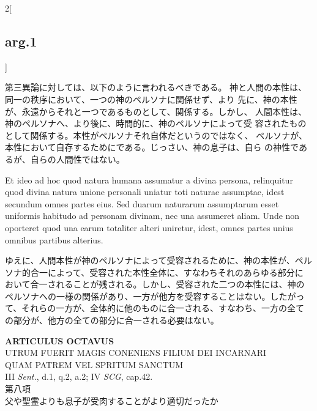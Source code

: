 \documentclass[paper=a4paper,fontsize=10pt,jafontsize=9pt,titlepage]{jlreq}
\begin{document}
\begin{paracol}{2}[\subsection{arg.1}]
\switchcolumn

第三異論に対しては、以下のように言われるべきである。
神と人間の本性は、同一の秩序において、一つの神のペルソナに関係せず、より
 先に、神の本性が、永遠からそれと一つであるものとして、関係する。しかし、
 人間本性は、神のペルソナへ、より後に、時間的に、神のペルソナによって受
 容されたものとして関係する。本性がペルソナそれ自体だというのではなく、
 ペルソナが、本性において自存するためにである。じっさい、神の息子は、自ら
 の神性であるが、自らの人間性ではない。

\switchcolumn*

Et ideo ad hoc quod natura humana assumatur a divina
persona, relinquitur quod divina natura unione personali uniatur toti
naturae assumptae, idest secundum omnes partes eius. Sed duarum
naturarum assumptarum esset uniformis habitudo ad personam divinam, nec
una assumeret aliam.
Unde non oporteret quod una earum totaliter alteri
uniretur, idest, omnes partes unius omnibus partibus alterius.

\switchcolumn

ゆえに、人間本性が神のペルソナによって受容されるために、神の本性が、ペル
 ソナ的合一によって、受容された本性全体に、すなわちそれのあらゆる部分に
 おいて合一されることが残される。しかし、受容された二つの本性には、神の
 ペルソナへの一様の関係があり、一方が他方を受容することはない。したがっ
 て、それらの一方が、全体的に他のものに合一される、すなわち、一方の全て
 の部分が、他方の全ての部分に合一される必要はない。

\end{paracol}
\newpage
{}
{}
\setcounter{section}{8}
\setcounter{subsection}{0}




\begin{center}
 {\Large {\bfseries ARTICULUS OCTAVUS}}\\
 {\large UTRUM FUERIT MAGIS CONENIENS FILIUM DEI INCARNARI\\QUAM PATREM
 VEL SPRITUM SANCTUM}\\
 {\footnotesize III {\itshape Sent.}, d.1, q.2, a.2; IV {\itshape SCG}, cap.42.}\\
 {\Large 第八項\\父や聖霊よりも息子が受肉することがより適切だったか}
\end{center}
\end{document}
